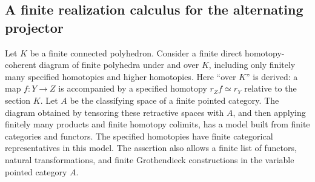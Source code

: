 
\subsection{A finite realization calculus for the alternating projector}

\begin{lemma}
\label{D:finite-coefficient-tensor}
Let $K$ be a finite connected polyhedron.  Consider a finite direct
homotopy-coherent diagram of finite polyhedra under and over $K$,
including only finitely many specified homotopies and higher homotopies.
Here ``over $K$'' is derived: a map $f:Y\to Z$ is accompanied by a
specified homotopy $r_Zf\simeq r_Y$ relative to the section $K$.
Let $A$ be the classifying space of a finite pointed category.
The diagram obtained by tensoring these retractive spaces with $A$,
and then applying finitely many products and finite homotopy colimits,
has a model built from finite categories and functors.  The specified
homotopies have finite categorical representatives in this model.
The assertion also allows a finite list of functors, natural
transformations, and finite Grothendieck constructions in the variable
pointed category $A$.
\end{lemma}
